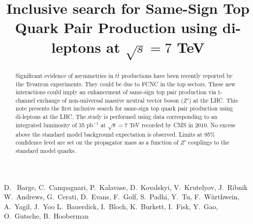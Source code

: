 \documentclass{cmspaper}
\begin{document}
%
\begin{titlepage}
\title{Inclusive search for Same-Sign Top Quark Pair Production using di-leptons at $\sqrt{s} = 7 $ TeV}

  \begin{Authlist}
    D.~ Barge, C.~Campagnari, P.~Kalavase, D.~Kovalskyi, V.~Krutelyov, J.~Ribnik
    W.~Andrews, G.~Cerati, D.~Evans, F.~Golf, S.~Padhi, Y.~Tu, F.~W\"urthwein, A.~Yagil, J.~Yoo
    L.~Bauerdick, I.~Bloch, K.~Burkett, I.~Fisk, Y.~Gao, O.~Gutsche, B.~Hooberman
  \end{Authlist}

\begin{abstract}
Significant evidence of asymmetries in $t\bar{t}$ productions have been recently 
reported by the Tevatron experiments.   They could be due to FCNC in the top
sectors.  These new interactions
could imply an enhancement of  same-sign top pair production via 
t-channel exchange of non-universal 
massive neutral vector boson ($Z'$) at the LHC. 
This note presents the first inclusive search for same-sign top quark 
pair production using di-leptons at the LHC. 
The study is performed using data corresponding to an integrated luminosity 
of 35 pb$^{-1}$ at $\sqrt{s} = 7 $ TeV recorded  by CMS in 2010. 
No excess above the standard model background expectation is observed. 
Limits at 95\% confidence level are set 
on the propagator mass as a function of $Z'$ couplings to the standard model quarks. 
\end{abstract}
\end{titlepage}





\clearpage

\end{document}

